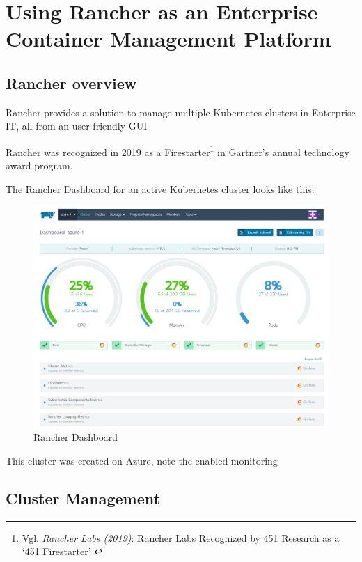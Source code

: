 %
%

\pagebreak
\section{Using Rancher as an Enterprise Container Management Platform}

\onehalfspacing

\subsection{Rancher overview}

Rancher provides a solution to manage multiple Kubernetes clusters in Enterprise IT, all from an user-friendly GUI

Rancher was recognized in 2019 as a Firestarter\footnote{Vgl. \textit{Rancher Labs (2019)}: Rancher Labs Recognized by 451 Research as a ‘451 Firestarter’ \cite{firestarter451}} in Gartner's annual technology award program.

The Rancher Dashboard for an active Kubernetes cluster looks like this:

\begin{figure}[h]
\centering
\includegraphics[width=\linewidth]{images/dashboard}
\caption {Rancher Dashboard}
\label{fig:rancherDashboard}
\end{figure}

This cluster was created on Azure, note the enabled monitoring 

\subsection{Cluster Management}

